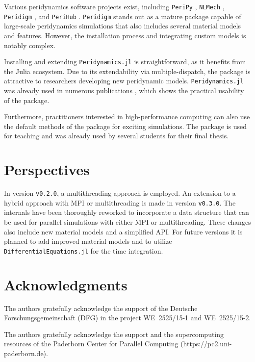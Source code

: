 \documentclass{juliacon}
\begin{document}
Various peridynamics software projects exist, including \texttt{PeriPy} \cite{PeriPy2021}, \texttt{NLMech} \cite{Jha2021}, \texttt{Peridigm} \cite{Peridigm2024}, and \texttt{PeriHub} \cite{Willberg2023}.
\texttt{Peridigm} stands out as a mature package capable of large-scale peridynamics simulations that also 
includes several material models and features.
However, the installation process and integrating custom models is notably complex.

Installing and extending \texttt{Peridynamics.jl} is straightforward, as it benefits from the Julia ecosystem.
Due to its extendability via multiple-dispatch, the package is attractive to researchers developing new peridynamic models.
\texttt{Peridynamics.jl} was already used in numerous publications \cite{Friebertshaeuser2022PAMM,Friebertshaeuser2022AIMS,Partmann2023IJF,Partmann2024AAM,Partmann2024PAMM,Tornquist2022PAMM}, which shows the practical usability of the package.

Furthermore, practitioners interested in high-performance computing can also use the default methods of the package for exciting simulations.
The package is used for teaching and was already used by several students for their final thesis.

\section{Perspectives}
In version \texttt{v0.2.0}, a multithreading approach is employed.
An extension to a hybrid approach with MPI or multithreading is made in version \texttt{v0.3.0}.
The internals have been thoroughly reworked to incorporate a data structure that can be used for parallel simulations with either MPI or multithreading.
These changes also include new material models and a simplified API.
For future versions it is planned to add improved material models and to utilize \texttt{DifferentialEquations.jl} for the time integration.

\section{Acknowledgments}
The authors gratefully acknowledge the support of the Deutsche Forschungsgemeinschaft (DFG) in the project \mbox{WE~2525/15-1} and \mbox{WE~2525/15-2}.

The authors gratefully acknowledge the support and the supercomputing resources of the Paderborn Center for Parallel Computing (https://pc2.uni-paderborn.de).



\end{document}
